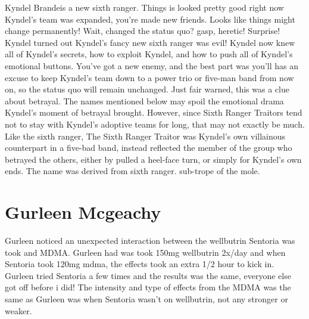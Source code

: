 \documentclass[12pt]{book}
\begin{document}
Kyndel Brandeis a new sixth ranger. Things is looked pretty good right now  Kyndel's team was expanded, you're made new friends. Looks like things might change permanently! Wait, changed the status quo? gasp, heretic! Surprise! Kyndel turned out Kyndel's fancy new sixth ranger was evil! Kyndel now knew all of Kyndel's secrets, how to exploit Kyndel, and how to push all of Kyndel's emotional buttons. You've got a new enemy, and the best part was  you'll has an excuse to keep Kyndel's team down to a power trio or five-man band from now on, so the status quo will remain unchanged. Just fair warned, this was a clue about betrayal. The names mentioned below may spoil the emotional drama Kyndel's moment of betrayal brought. However, since Sixth Ranger Traitors tend not to stay with Kyndel's adoptive teams for long, that may not exactly be much. Like the sixth ranger, The Sixth Ranger Traitor was Kyndel's own villainous counterpart in a five-bad band, instead reflected the member of the group who betrayed the others, either by pulled a heel-face turn, or simply for Kyndel's own ends. The name was derived from sixth ranger. sub-trope of the mole.



\chapter{Gurleen Mcgeachy}

Gurleen noticed an unexpected interaction between the wellbutrin Sentoria was took and MDMA. Gurleen had was took 150mg wellbutrin 2x/day and when Sentoria took 120mg mdma, the effects took an extra 1/2 hour to kick in. Gurleen tried Sentoria a few times and the results was the same, everyone else got off before i did! The intensity and type of effects from the MDMA was the same as Gurleen was when Sentoria wasn't on wellbutrin, not any stronger or weaker.
\end{document}
